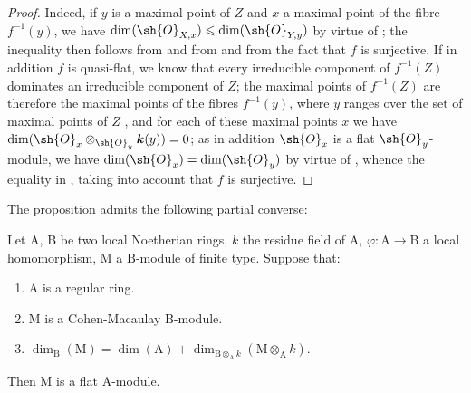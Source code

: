 \begin{proof}
Indeed, if $y$ is a maximal point of $Z$ and $x$ a maximal point of the fibre $f^{-1}(y)$, we have $\dim(\sh{O}_{X,x})\leqslant\dim(\sh{O}_{Y,y})$ by virtue of ; the inequality  then follows from  and from  and from the fact that $f$ is surjective.
If in addition $f$ is quasi-flat, we know  that every irreducible component of $f^{-1}(Z)$ dominates an irreducible component of $Z$; the maximal points of $f^{-1}(Z)$ are therefore the maximal points of the fibres $f^{-1}(y)$, where $y$ ranges over the set of maximal points of $Z$ , and for each of these maximal points $x$ we have $\dim(\sh{O}_x\otimes_{\sh{O}_y}\boldsymbol{k}(y))=0$; as in addition $\sh{O}_x$ is a flat $\sh{O}_y$-module, we have $\dim(\sh{O}_x)=\dim(\sh{O}_y)$ by virtue of , whence the equality in , taking into account that $f$ is surjective.
\end{proof}

The proposition  admits the following partial converse:

\begin{proposition}[6.1.5]
\label{IV.6.1.5}
Let $\mathrm{A}$, $\mathrm{B}$ be two local Noetherian rings, $k$ the residue field of $\mathrm{A}$, $\varphi:\mathrm{A}\to\mathrm{B}$ a local homomorphism, $\mathrm{M}$ a $\mathrm{B}$-module of finite type.
Suppose that:
\begin{enumerate}[label=\upshape\arabic{enumi}\textsuperscript{o}]
  \item $\mathrm{A}$ is a regular ring.
  \item $\mathrm{M}$ is a Cohen-Macaulay $\mathrm{B}$-module.
  \item $\dim_\mathrm{B}(\mathrm{M})=\dim(\mathrm{A})+\dim_{\mathrm{B}\otimes_\mathrm{A} k}(\mathrm{M}\otimes_\mathrm{A} k)$.
\end{enumerate}
Then $\mathrm{M}$ is a flat $\mathrm{A}$-module.
\end{proposition}

